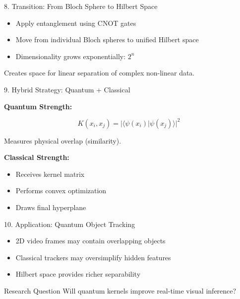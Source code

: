 \documentclass{beamer}
\begin{document}
\begin{frame}{8. Transition: From Bloch Sphere to Hilbert Space}

\begin{itemize}
    \item Apply entanglement using CNOT gates
    \item Move from individual Bloch spheres to unified Hilbert space
    \item Dimensionality grows exponentially: $2^n$
\end{itemize}

Creates space for linear separation of complex non-linear data.

\end{frame}

\begin{frame}{9. Hybrid Strategy: Quantum + Classical}

\textbf{Quantum Strength:}

\[
K(x_i, x_j) = |\langle\psi(x_i)|\psi(x_j)\rangle|^2
\]

Measures physical overlap (similarity).

\textbf{Classical Strength:}

\begin{itemize}
    \item Receives kernel matrix
    \item Performs convex optimization
    \item Draws final hyperplane
\end{itemize}

\end{frame}

\begin{frame}{10. Application: Quantum Object Tracking}

\begin{itemize}
    \item 2D video frames may contain overlapping objects
    \item Classical trackers may oversimplify hidden features
    \item Hilbert space provides richer separability
\end{itemize}

\begin{ResearchBox}{Research Question}
Will quantum kernels improve real-time visual inference?
\end{ResearchBox}

\end{frame}
\end{document}
